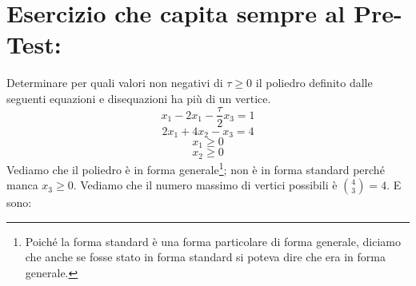 \section{Esercizio che capita sempre al Pre-Test:} Determinare per quali valori non negativi di $\tau \geq 0$ il poliedro definito dalle seguenti equazioni e disequazioni ha più di un vertice.
\begin{equation*}
    x_1 - 2x_1 - \frac{\tau}{2}x_3 = 1
\end{equation*}
\begin{equation*}
    2x_1 + 4x_2 - x_3 = 4
\end{equation*}
\begin{equation*}
    x_1 \geq 0
\end{equation*}
\begin{equation*}
    x_2 \geq 0
\end{equation*}
Vediamo che il poliedro è in forma generale\footnote{Poiché la forma standard è una forma particolare di forma generale, diciamo che anche se fosse stato in forma standard si poteva dire che era in forma generale.}; non è in forma standard perché manca $x_3 \geq 0$. Vediamo che il numero massimo di vertici possibili è $\binom{4}{3} = 4$. E sono:
